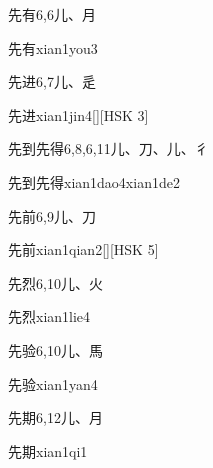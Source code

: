\begin{Entry}{先有}{6,6}{⼉、⽉}
  \begin{Phonetics}{先有}{xian1you3}
  \end{Phonetics}
\end{Entry}

\begin{Entry}{先进}{6,7}{⼉、⾡}
  \begin{Phonetics}{先进}{xian1jin4}[][HSK 3]
  \end{Phonetics}
\end{Entry}

\begin{Entry}{先到先得}{6,8,6,11}{⼉、⼑、⼉、⼻}
  \begin{Phonetics}{先到先得}{xian1dao4xian1de2}
  \end{Phonetics}
\end{Entry}

\begin{Entry}{先前}{6,9}{⼉、⼑}
  \begin{Phonetics}{先前}{xian1qian2}[][HSK 5]
  \end{Phonetics}
\end{Entry}

\begin{Entry}{先烈}{6,10}{⼉、⽕}
  \begin{Phonetics}{先烈}{xian1lie4}
  \end{Phonetics}
\end{Entry}

\begin{Entry}{先验}{6,10}{⼉、⾺}
  \begin{Phonetics}{先验}{xian1yan4}
  \end{Phonetics}
\end{Entry}

\begin{Entry}{先期}{6,12}{⼉、⽉}
  \begin{Phonetics}{先期}{xian1qi1}
  \end{Phonetics}
\end{Entry}

